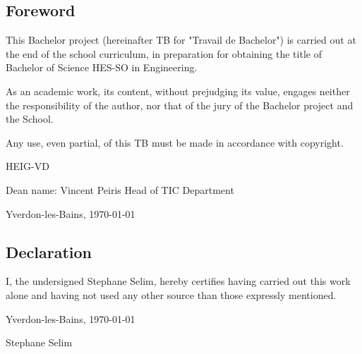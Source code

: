 \documentclass[12pt]{article}
\begin{document}
\vspace*{\fill}
\begin{center}
\section{Foreword}  
This Bachelor project (hereinafter TB for "Travail de Bachelor") is carried out at the end of the school curriculum, in preparation for obtaining the title of Bachelor of Science HES-SO in Engineering.

As an academic work, its content, without prejudging its value, engages neither the responsibility of the author, nor that of the jury of the Bachelor project and the School.

Any use, even partial, of this TB must be made in accordance with copyright.

\vfill
\begin{flushright}
HEIG-VD

Dean name: Vincent Peiris \break
Head of TIC Department
\end{flushright}

\vfill
\begin{flushleft}
Yverdon-les-Bains, \today
\end{flushleft}

\end{center}
\vspace*{\fill}

\pagebreak

\vspace*{\fill}
\begin{center}
\section{Declaration}

I, the undersigned Stephane Selim, hereby certifies having carried out this work alone and having not used any other source than those expressly mentioned.

\vfill
\begin{flushleft}
Yverdon-les-Bains, \today
\end{flushleft}

\vfill
\begin{flushright}
Stephane Selim
\end{flushright}

\end{center}
\vspace*{\fill}

\pagebreak
\end{document}
